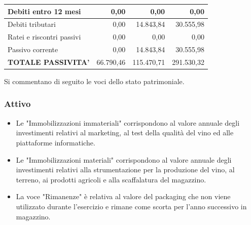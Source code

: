 \documentclass[12pt, a4paper]{article}
\begin{document}
\begin{center}
\begin{tabular}{|l|r|r|r|}
        Debiti entro 12 mesi                                           & 0,00                                                          & 0,00                                                          & 0,00                                                          \\ \hline
        Debiti tributari                                               & 0,00                                                          & 14.843,84                                                     & 30.555,98                                                     \\ \hline
        Ratei e riscontri passivi                                      & 0,00                                                          & 0,00                                                          & 0,00                                                          \\ \hline
        Passivo corrente                                               & 0,00                                                          & 14.843,84                                                     & 30.555,98                                                     \\ \hline
        \rowcolor[HTML]{CBCEFB}
        \textbf{TOTALE PASSIVITA'}                                     & 66.790,46                                                     & 115.470,71                                                    & 291.530,32                                                    \\ \hline
    \end{tabular}
\end{center}
\newpage\noindent
Si commentano di seguito le voci dello stato patrimoniale.
\subsubsection*{Attivo}
\begin{itemize}
    \item Le "Immobilizzazioni immateriali" corrispondono al valore annuale degli investimenti relativi al marketing, al test della qualità del vino ed alle piattaforme informatiche.
    \item Le "Immobilizzazioni materiali" corrispondono al valore annuale degli investimenti relativi alla strumentazione per la produzione del vino, al terreno, ai prodotti agricoli e alla scaffalatura del magazzino.
    \item La voce "Rimanenze" è relativa al valore del packaging che non viene utilizzato durante l'esercizio e rimane come scorta per l'anno successivo in magazzino.
\end{itemize}
\end{document}
